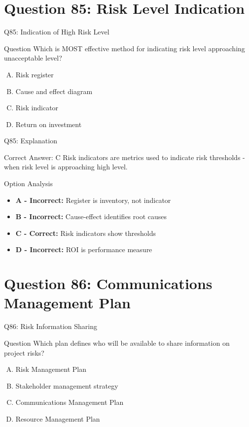 \documentclass{beamer}
\begin{document}
	\section{Question 85: Risk Level Indication}
	
	\begin{frame}{Q85: Indication of High Risk Level}
		\begin{block}{Question}
			Which is MOST effective method for indicating risk level approaching unacceptable level?
		\end{block}
		\begin{enumerate}[(A)]
			\item Risk register
			\item Cause and effect diagram
			\item Risk indicator
			\item Return on investment
		\end{enumerate}
	\end{frame}
	
	\begin{frame}{Q85: Explanation}
		\begin{block}{Correct Answer: C}
			Risk indicators are metrics used to indicate risk thresholds - when risk level is approaching high level.
		\end{block}
		\begin{block}{Option Analysis}
			\begin{itemize}
				\item \textbf{A - Incorrect:} Register is inventory, not indicator
				\item \textbf{B - Incorrect:} Cause-effect identifies root causes
				\item \textbf{C - Correct:} Risk indicators show thresholds
				\item \textbf{D - Incorrect:} ROI is performance measure
			\end{itemize}
		\end{block}
	\end{frame}
	
	\section{Question 86: Communications Management Plan}
	
	\begin{frame}{Q86: Risk Information Sharing}
		\begin{block}{Question}
			Which plan defines who will be available to share information on project risks?
		\end{block}
		\begin{enumerate}[(A)]
			\item Risk Management Plan
			\item Stakeholder management strategy
			\item Communications Management Plan
			\item Resource Management Plan
		\end{enumerate}
	\end{frame}
	
\end{document}
